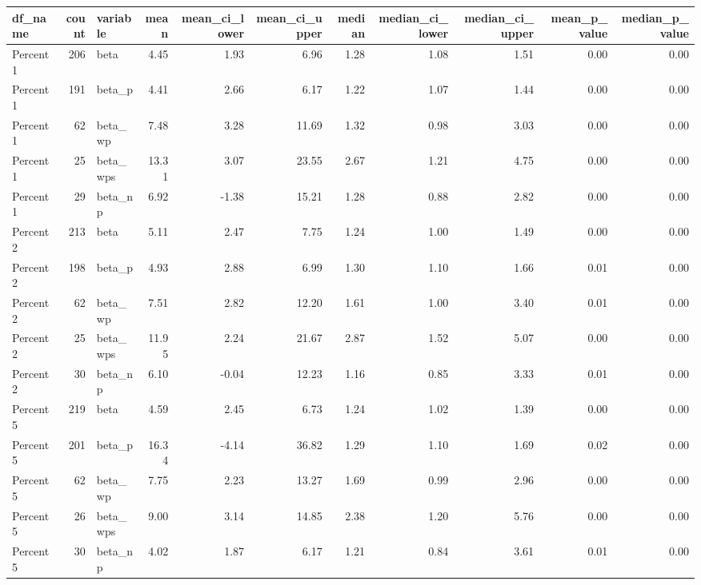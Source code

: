 \begin{tabular}{lrlrrrrrrrr}
  \hline
df\_name & count & variable & mean & mean\_ci\_lower & mean\_ci\_upper & median & median\_ci\_lower & median\_ci\_upper & mean\_p\_value & median\_p\_value \\ 
  \hline
Percent1 & 206 & beta & 4.45 & 1.93 & 6.96 & 1.28 & 1.08 & 1.51 & 0.00 & 0.00 \\ 
  Percent1 & 191 & beta\_p & 4.41 & 2.66 & 6.17 & 1.22 & 1.07 & 1.44 & 0.00 & 0.00 \\ 
  Percent1 &  62 & beta\_wp & 7.48 & 3.28 & 11.69 & 1.32 & 0.98 & 3.03 & 0.00 & 0.00 \\ 
  Percent1 &  25 & beta\_wps & 13.31 & 3.07 & 23.55 & 2.67 & 1.21 & 4.75 & 0.00 & 0.00 \\ 
  Percent1 &  29 & beta\_np & 6.92 & -1.38 & 15.21 & 1.28 & 0.88 & 2.82 & 0.00 & 0.00 \\ 
  Percent2 & 213 & beta & 5.11 & 2.47 & 7.75 & 1.24 & 1.00 & 1.49 & 0.00 & 0.00 \\ 
  Percent2 & 198 & beta\_p & 4.93 & 2.88 & 6.99 & 1.30 & 1.10 & 1.66 & 0.01 & 0.00 \\ 
  Percent2 &  62 & beta\_wp & 7.51 & 2.82 & 12.20 & 1.61 & 1.00 & 3.40 & 0.01 & 0.00 \\ 
  Percent2 &  25 & beta\_wps & 11.95 & 2.24 & 21.67 & 2.87 & 1.52 & 5.07 & 0.00 & 0.00 \\ 
  Percent2 &  30 & beta\_np & 6.10 & -0.04 & 12.23 & 1.16 & 0.85 & 3.33 & 0.01 & 0.00 \\ 
  Percent5 & 219 & beta & 4.59 & 2.45 & 6.73 & 1.24 & 1.02 & 1.39 & 0.00 & 0.00 \\ 
  Percent5 & 201 & beta\_p & 16.34 & -4.14 & 36.82 & 1.29 & 1.10 & 1.69 & 0.02 & 0.00 \\ 
  Percent5 &  62 & beta\_wp & 7.75 & 2.23 & 13.27 & 1.69 & 0.99 & 2.96 & 0.00 & 0.00 \\ 
  Percent5 &  26 & beta\_wps & 9.00 & 3.14 & 14.85 & 2.38 & 1.20 & 5.76 & 0.00 & 0.00 \\ 
  Percent5 &  30 & beta\_np & 4.02 & 1.87 & 6.17 & 1.21 & 0.84 & 3.61 & 0.01 & 0.00 \\ 
   \hline
\end{tabular}
